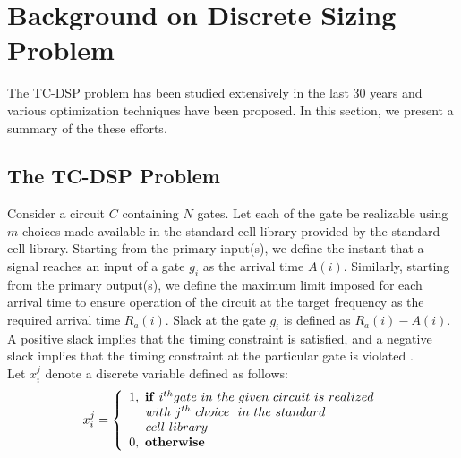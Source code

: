\section{Background on Discrete Sizing Problem}
\label{sec:background}
The TC-DSP problem has been studied extensively in the last 30 years and various optimization techniques have been proposed. In this section, we present a summary of the these efforts.



\subsection{The TC-DSP Problem}

\noindent Consider a circuit $C$ containing $N$ gates. Let each of the gate be realizable using $m$ choices made available in the standard cell library provided by the standard cell library. Starting from the primary input(s), we define the instant that a signal reaches an input of a gate $g_i$ as the arrival time $A(i)$. Similarly, starting from the primary output(s), we define the maximum limit imposed for each arrival time to ensure operation of the  circuit at the target frequency as the required arrival time $R_{a}(i)$. Slack at the gate $g_i$ is defined as $R_{a}(i) - A(i)$. A positive slack implies that the timing constraint is satisfied, and a negative slack implies that the timing constraint at the particular gate is violated \cite{taucontest}.\\




 Let $x_{i}^{j}$ denote a discrete variable defined as follows:\\
  \begin{equation}
   {x_{i}^{j}} =
   \left\{
           \begin{array}{lllll}
                  1, \ {\bf if}\ i^{th} gate\  in\ the\ given\ circuit\ is\ realized\\
                  \  \  \ \ with\ j^{th}\ choice\ \ in\ the\ standard\\
                  \   \  \ \ cell\  library\\
                  0, \ {\bf otherwise}\\
          \end{array}
  \right.
  \end{equation}
 

